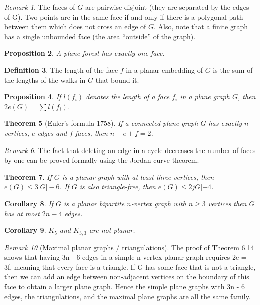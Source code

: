 \documentclass[11pt, fleqn, a4paper, landscape]{article}
\theoremstyle{plain} %
\newtheorem{thm}{Theorem}
\newtheorem{pro}[thm]{Proposition}
\newtheorem{cor}[thm]{Corollary}
\theoremstyle{remark} %
\newtheorem{rem}[thm]{Remark}
\theoremstyle{definition} %
\newtheorem{defi}[thm]{Definition}
\begin{document}
\begin{multicols}{3}
\begin{rem}
The faces of $G$ are pairwise disjoint (they are separated by the edges of G). Two points are in the same face if and only if there is a polygonal path between them which does not cross an edge of $G$. Also, note that a finite graph has a single unbounded face (the area “outside” of the graph).
\end{rem}

\begin{pro}
A plane forest has exactly one face.
\end{pro}

\begin{defi}
The length of the face $f$ in a planar embedding of $G$ is the sum of the lengths of the walks in $G$ that bound it.
\end{defi}
\addtocounter{thm}{1}
\begin{pro}
If $l(f_i)$ denotes the length of a face $f_i$ in a plane graph $G$, then $2e(G) = \sum l(f_i)$.
\end{pro}

\begin{thm}[Euler's formula 1758]
If a connected plane graph $G$ has exactly $n$ vertices, $e$ edges
and $f$ faces, then $n - e + f = 2$.
\end{thm}

\begin{rem}
The fact that deleting an edge in a cycle decreases the number of faces by one can be proved formally using the Jordan curve theorem.
\end{rem}
\begin{thm}
If $G$ is a planar graph with at least three vertices, then $e(G) \le 3|G|- 6$. If $G$ is also triangle-free, then $e(G)\le 2jG|- 4$.
\end{thm}

\begin{cor}
If $G$ is a planar bipartite $n$-vertex graph with $n \ge 3$ vertices then $G$ has at most $2n - 4$ edges.
\end{cor}

\begin{cor}
$K_5$ and $K_{3,3}$ are not planar.
\end{cor}

\begin{rem}[Maximal planar graphs / triangulations]
The proof of Theorem 6.14 shows that
having 3n - 6 edges in a simple n-vertex planar graph requires 2e = 3f, meaning that every face is
a triangle. If G has some face that is not a triangle, then we can add an edge between non-adjacent
vertices on the boundary of this face to obtain a larger plane graph. Hence the simple plane graphs
with 3n - 6 edges, the triangulations, and the maximal plane graphs are all the same family.
\end{rem}


\end{multicols}
\end{document}

